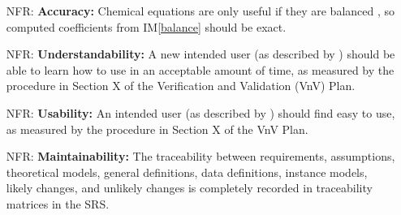 \documentclass[12pt]{article}
\newcommand{\iref}[1]{IM\ref{#1}}
\newcounter{nfrnum} %
\begin{document}
\noindent \begin{itemize}

\item[NFR\refstepcounter{nfrnum}\thenfrnum \label{NFR_accuracy}:]
  \textbf{Accuracy:} Chemical equations are only useful if they are balanced
  \cite{lund_introduction_2023}, so computed coefficients from \iref{balance}
  should be exact.
  
  

\item[NFR\refstepcounter{nfrnum}\thenfrnum \label{NFR_understandability}:]
	\textbf{Understandability:} A new intended user (as described by
	) should be able to learn how to use \progname{} in an
	acceptable amount of time, as measured by the procedure in Section X of
	the Verification and Validation (VnV) Plan.

\item[NFR\refstepcounter{nfrnum}\thenfrnum \label{NFR_usability}:]
	\textbf{Usability:} An intended user (as described by )
	should find \progname{} easy to use, as measured by the procedure in Section X
	of the VnV Plan.

\item[NFR\refstepcounter{nfrnum}\thenfrnum \label{NFR_maintainability}:]
  \textbf{Maintainability:} The traceability between requirements, assumptions,
  theoretical models, general definitions, data definitions, instance models,
  likely changes, and unlikely changes is completely recorded in
  traceability matrices in the SRS.
  


\end{itemize}
\end{document}
